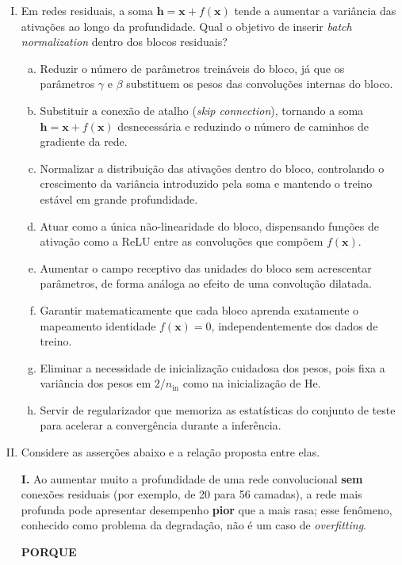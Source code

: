 \documentclass{dlproblemset}
\begin{document}
\begin{enumerate}[I)]
    \item Em redes residuais, a soma $\mathbf{h} = \mathbf{x} + f(\mathbf{x})$ tende a aumentar a variância das ativações ao longo da profundidade. Qual o objetivo de inserir \textit{batch normalization} dentro dos blocos residuais?
    \begin{enumerate}[a)]
        \item Reduzir o número de parâmetros treináveis do bloco, já que os parâmetros $\gamma$ e $\beta$ substituem os pesos das convoluções internas do bloco.
        \item Substituir a conexão de atalho (\textit{skip connection}), tornando a soma $\mathbf{h} = \mathbf{x} + f(\mathbf{x})$ desnecessária e reduzindo o número de caminhos de gradiente da rede.
        \item Normalizar a distribuição das ativações dentro do bloco, controlando o crescimento da variância introduzido pela soma e mantendo o treino estável em grande profundidade.
        \item Atuar como a única não-linearidade do bloco, dispensando funções de ativação como a ReLU entre as convoluções que compõem $f(\mathbf{x})$.
        \item Aumentar o campo receptivo das unidades do bloco sem acrescentar parâmetros, de forma análoga ao efeito de uma convolução dilatada.
        \item Garantir matematicamente que cada bloco aprenda exatamente o mapeamento identidade $f(\mathbf{x}) = 0$, independentemente dos dados de treino.
        \item Eliminar a necessidade de inicialização cuidadosa dos pesos, pois fixa a variância dos pesos em $2/n_{\text{in}}$ como na inicialização de He.
        \item Servir de regularizador que memoriza as estatísticas do conjunto de teste para acelerar a convergência durante a inferência.
    \end{enumerate}

    \item Considere as asserções abaixo e a relação proposta entre elas.

    \textbf{I.} Ao aumentar muito a profundidade de uma rede convolucional \textbf{sem} conexões residuais (por exemplo, de 20 para 56 camadas), a rede mais profunda pode apresentar desempenho \textbf{pior} que a mais rasa; esse fenômeno, conhecido como problema da degradação, não é um caso de \textit{overfitting}.

    \begin{center}\textbf{PORQUE}\end{center}


\end{enumerate}
\end{document}
